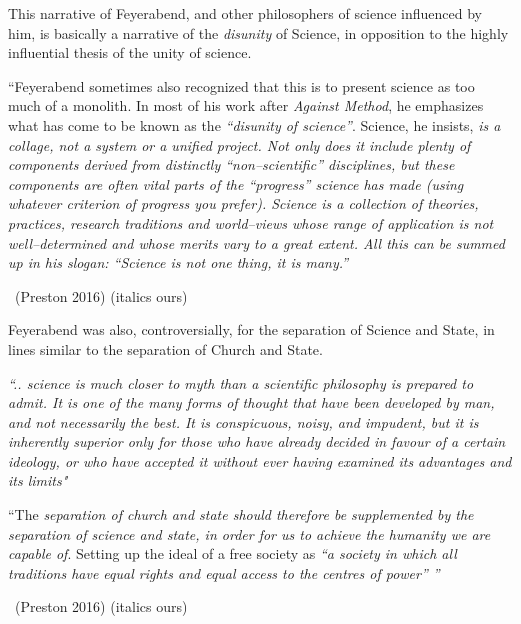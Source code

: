 \newpage

This narrative of Feyerabend, and other philosophers of science influenced by him, is basically a narrative of the \textit{disunity} of Science, in opposition to the highly influential thesis of the unity of science.

\vskip 2pt

\begin{myquote}
“Feyerabend sometimes also recognized that this is to present science as too much of a monolith. In most of his work after \textit{Against Method}, he emphasizes what has come to be known as the \textit{“disunity of science”}. Science, he insists, \textit{is a collage, not a system or a unified project. Not only does it include plenty of components derived from distinctly “non–scientific” disciplines, but these components are often vital parts of the “progress” science has made (using whatever criterion of progress you prefer). Science is a collection of theories, practices, research traditions and world–views whose range of application is not well–determined and whose merits vary to a great extent. All this can be summed up in his slogan: “Science is not one thing, it is many.”} 

~\hfill (Preston 2016) (italics ours)
\end{myquote}

\vskip 2pt

Feyerabend was also, controversially, for the separation of Science and State, in lines similar to the separation of Church and State.

\vskip 2pt

\begin{myquote}
\textit{“.. science is much closer to myth than a scientific philosophy is prepared to admit. It is one of the many forms of thought that have been developed by man, and not necessarily the best. It is conspicuous, noisy, and impudent, but it is inherently superior only for those who have already decided in favour of a certain ideology, or who have accepted it without ever having examined its advantages and its limits"}
\end{myquote}

\vskip 2pt

\begin{myquote}
“The \textit{separation of church and state should therefore be supplemented by the separation of science and state, in order for us to achieve the humanity we are capable of}. Setting up the ideal of a free society as \textit{“a society in which all traditions have equal rights and equal access to the centres of power” ”} 

~\hfill (Preston 2016) (italics ours)
\end{myquote}

